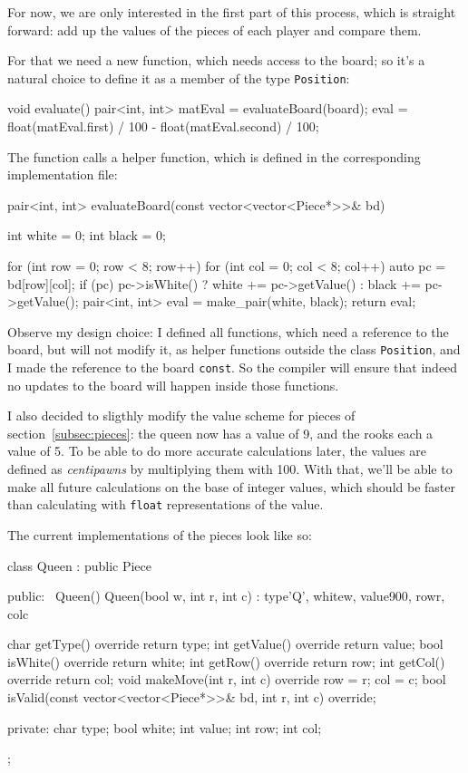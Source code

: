 For now, we are only interested in the first part of this process, which is straight forward:
add up the values of the pieces of each player and compare them.

For that we need a new function, which needs access to the board; so it's
a natural choice to define it as a member of the type \texttt{Position}:

\begin{cpp}
void evaluate() {
  pair<int, int> matEval = evaluateBoard(board);
  eval = float(matEval.first) / 100
       - float(matEval.second) / 100;
}
\end{cpp}

The function calls a helper function, which is defined in the corresponding implementation file:

\begin{cpp}
pair<int, int> evaluateBoard(const vector<vector<Piece*>>& bd) {
  int white = 0;
  int black = 0;
  
  for (int row = 0; row < 8; row++) {
    for (int col = 0; col < 8; col++) {
      auto pc = bd[row][col];
      if (pc) {
        pc->isWhite() ? white += pc->getValue()
                      : black += pc->getValue();
      }
    }
  }
  pair<int, int> eval = make_pair(white, black);
  return eval;
}
\end{cpp}

Observe my design choice: I defined all functions, which need a reference to the board, but
will not modify it, as helper functions outside the class \texttt{Position}, and I made the
reference to the board \texttt{const}. So the compiler will ensure that indeed
no updates to the board will happen inside those functions.

I also decided to sligthly modify the value scheme for pieces of section~\ref{subsec:pieces}:
the queen now has a value of 9, and the rooks each a value of 5.
To be able to do more accurate calculations later, the values are defined as \emph{centipawns}
by multiplying them with 100.
With that, we'll be able to make all future calculations on the base of integer values,
which should be faster than calculating with \texttt{float} representations of the
value.

The current implementations of the pieces look like so:

\begin{cpp}
class Queen : public Piece {
public:
  ~Queen() {}
  Queen(bool w, int r, int c) :
    type{'Q'}, white{w}, value{900}, row{r}, col{c} {}

  char getType() override { return type; }
  int getValue() override { return value; }
  bool isWhite() override { return white; }
  int getRow() override { return row; }
  int getCol() override { return col; }
  void makeMove(int r, int c) override { row = r; col = c; }
  bool isValid(const vector<vector<Piece*>>& bd, int r, int c) override;

private:
  char type;
  bool white;
  int value;
  int row;
  int col;
};
\end{cpp}

